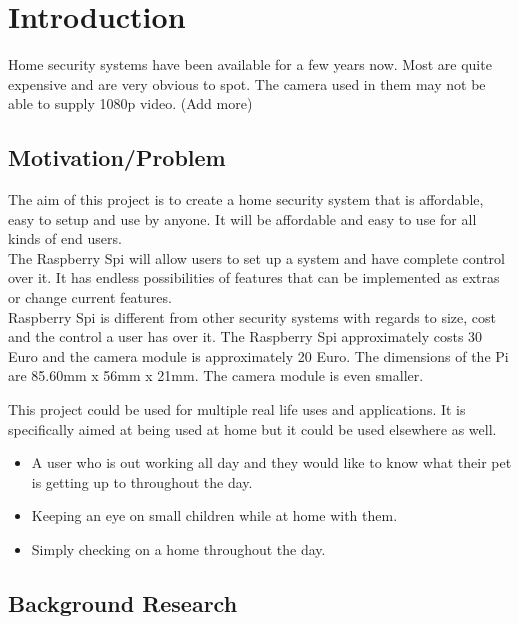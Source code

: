 \documentclass[]{report}
\begin{document}
\tableofcontents
\chapter{Introduction}
\label{ch:intro} 

Home security systems have been available for a few years now. Most are quite expensive and are very obvious to spot. The camera used in them may not be able to supply 1080p video. (Add more)

\section{Motivation/Problem}
\label{sec:motprob}
The aim of this project is to create a home security system that is affordable, easy to setup and use by anyone. It will be affordable and easy to use for all kinds of end users.\\

The Raspberry Spi will allow users to set up a system and have complete control over it. It has endless possibilities of features that can be implemented as extras or change current features.\\

Raspberry Spi is different from other security systems with regards to size, cost and the control a user has over it. The Raspberry Spi approximately costs 30 Euro and the camera module is approximately 20 Euro. The dimensions of the Pi are 85.60mm x 56mm x 21mm. The camera module is even smaller.

This project could be used for multiple real life uses and applications. It is specifically aimed at being used at home but it could be used elsewhere as well.

\begin{itemize}
  \item A user who is out working all day and they would like to know what their pet is getting up to throughout the day.\\
  \item Keeping an eye on small children while at home with them.\\
  \item Simply checking on a home throughout the day.\\
\end{itemize}
% 
\section{Background Research}
\label{sec:research}
\end{document}
